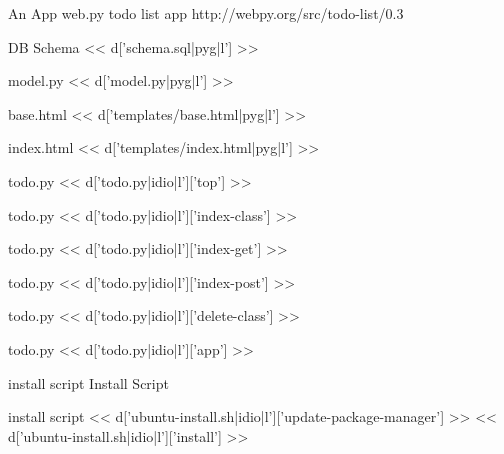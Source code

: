 \documentclass{beamer}
\begin{document}
\begin{frame}{An App}
web.py todo list app
http://webpy.org/src/todo-list/0.3
\end{frame}

\begin{frame}[fragile]{DB Schema}
<< d['schema.sql|pyg|l'] >>
\end{frame}

\footnotesize

\begin{frame}[fragile]{model.py}
<< d['model.py|pyg|l'] >>
\end{frame}

\begin{frame}[fragile]{base.html}
<< d['templates/base.html|pyg|l'] >>
\end{frame}

\begin{frame}[fragile]{index.html}
\scriptsize
<< d['templates/index.html|pyg|l'] >>
\footnotesize
\end{frame}

\begin{frame}[fragile]{todo.py}
<< d['todo.py|idio|l']['top'] >>
\end{frame}

\begin{frame}[fragile]{todo.py}
<< d['todo.py|idio|l']['index-class'] >>
\end{frame}

\begin{frame}[fragile]{todo.py}
<< d['todo.py|idio|l']['index-get'] >>
\end{frame}

\begin{frame}[fragile]{todo.py}
<< d['todo.py|idio|l']['index-post'] >>
\end{frame}

\begin{frame}[fragile]{todo.py}
<< d['todo.py|idio|l']['delete-class'] >>
\end{frame}

\begin{frame}[fragile]{todo.py}
<< d['todo.py|idio|l']['app'] >>
\end{frame}

\begin{frame}[fragile]{install script}
Install Script
\end{frame}


\begin{frame}[fragile]{install script}
<< d['ubuntu-install.sh|idio|l']['update-package-manager'] >>
<< d['ubuntu-install.sh|idio|l']['install'] >>
\end{frame}
\end{document}
